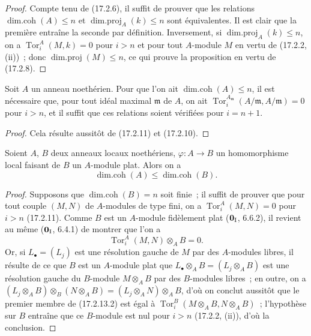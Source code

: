 \begin{proof}
Compte tenu de (17.2.6), il suffit de prouver que les relations
$\operatorname{dim.coh}(A)\leq n$ et
$\operatorname{dim.proj}_A(k)\leq n$ sont équivalentes. Il est clair que la
première entraîne la seconde par définition. Inversement, si
$\operatorname{dim.proj}_A(k)\leq n$, on a
$\operatorname{Tor}^A_i(M,k)=0$ pour $i>n$ et pour tout $A$-module $M$ en
vertu de (17.2.2, (ii))~; donc $\operatorname{dim.proj}(M)\leq n$, ce qui
prouve la proposition en vertu de (17.2.8).
\end{proof}

\begin{corollary}[17.2.12]
\label{0.17.2.12-fr}
Soit $A$ un anneau noethérien. Pour que l'on ait
$\operatorname{dim.coh}(A)\leq n$, il est nécessaire que, pour tout idéal
maximal $\mathfrak{m}$ de $A$, on ait
$\operatorname{Tor}^{A_{\mathfrak{m}}}_i(A/\mathfrak{m},A/\mathfrak{m})=0$
pour $i>n$, et il suffit que ces relations soient vérifiées pour $i=n+1$.
\end{corollary}

\begin{proof}
Cela résulte aussitôt de (17.2.11) et (17.2.10).
\end{proof}

\begin{proposition}[17.2.13]
\label{0.17.2.13-fr}
Soient $A$, $B$ deux anneaux locaux noethériens,
$\varphi:A\longrightarrow B$ un homomorphisme local faisant de $B$ un
$A$-module plat. Alors on a
\begin{equation}
\label{0.17.2.13.1-fr}
\tag{17.2.13.1}
  \operatorname{dim.coh}(A)\leq\operatorname{dim.coh}(B).
\end{equation}
\end{proposition}

\begin{proof}
Supposons que $\operatorname{dim.coh}(B)=n$ soit finie~; il suffit de prouver
que pour tout couple $(M,N)$ de $A$-modules de type fini, on a
$\operatorname{Tor}^A_i(M,N)=0$ pour $i>n$ (17.2.11). Comme $B$ est un
$A$-module fidèlement plat ($\mathbf{0}_{\rm I}$, 6.6.2), il revient au même
($\mathbf{0}_{\rm I}$, 6.4.1) de montrer que l'on a
\begin{equation}
\label{0.17.2.13.2-fr}
\tag{17.2.13.2}
  \operatorname{Tor}^A_i(M,N)\otimes_A B=0.
\end{equation}
Or, si $L_\bullet=(L_j)$ est une résolution gauche de $M$ par des $A$-modules
libres, il résulte de ce que $B$ est un $A$-module plat que
$L_\bullet\otimes_A B=(L_j\otimes_A B)$ est une résolution gauche du
$B$-module $M\otimes_A B$ par des $B$-modules libres~; en outre, on a
$(L_j\otimes_A B)\otimes_B(N\otimes_A B)
=(L_j\otimes_A N)\otimes_A B$, d'où on conclut aussitôt que le premier membre
de (17.2.13.2) est égal à
$\operatorname{Tor}^B_i(M\otimes_A B,N\otimes_A B)$~; l'hypothèse sur $B$
entraîne que ce $B$-module est nul pour $i>n$ (17.2.2, (ii)), d'où la
conclusion.
\end{proof}

